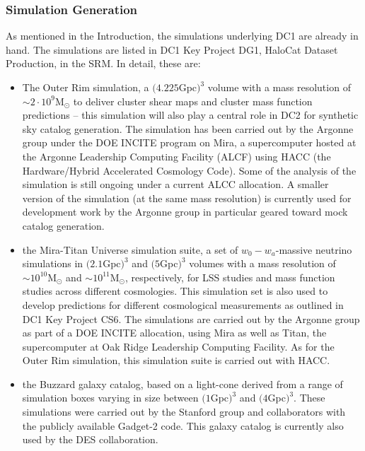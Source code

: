 \subsubsection{Simulation Generation}
\label{sec:keysims:dc1:simgen}
As mentioned in the Introduction, the simulations underlying DC1 are already in hand. The simulations are listed in DC1 Key Project DG1, HaloCat Dataset Production, in the SRM. In detail, these are:
\begin{itemize}

\item The Outer Rim simulation, a $(4.225 $Gpc$)^3$ volume with a mass resolution of $\sim 2\cdot 10^9$M$_\odot$ to deliver cluster shear maps and cluster mass function predictions -- this simulation will also play a central role in DC2 for synthetic sky catalog generation. The simulation has been carried out by the Argonne group under the DOE INCITE program on Mira, a supercomputer hosted at the Argonne Leadership Computing Facility (ALCF) using HACC (the Hardware/Hybrid Accelerated Cosmology Code). Some of the analysis of the simulation is still ongoing under a current ALCC allocation. A smaller version of the simulation (at the same mass resolution) is currently used for development work by the Argonne group in particular geared toward mock catalog generation.

\item the Mira-Titan Universe simulation suite, a set of $w_0-w_a$-massive neutrino simulations in $(2.1$Gpc$)^3$ and $(5$Gpc$)^3$ volumes with a mass resolution of $\sim10^{10}$M$_\odot$ and $\sim 10^{11}$M$_\odot$, respectively, for LSS studies and mass function studies across different cosmologies. This simulation set is also used to develop predictions for different cosmological measurements as outlined in DC1 Key Project CS6. The simulations are carried out by the Argonne group as part of a DOE INCITE allocation, using Mira as well as Titan, the supercomputer at Oak Ridge Leadership Computing Facility. As for the Outer Rim simulation, this simulation suite is carried out with HACC.

\item the Buzzard galaxy catalog, based on a light-cone derived from a range of simulation boxes varying in size between $(1$Gpc$)^3$ and $(4$Gpc$)^3$. These simulations were carried out by the Stanford group and collaborators with the publicly available Gadget-2 code. This galaxy catalog is currently also used by the DES collaboration.

\end{itemize}


